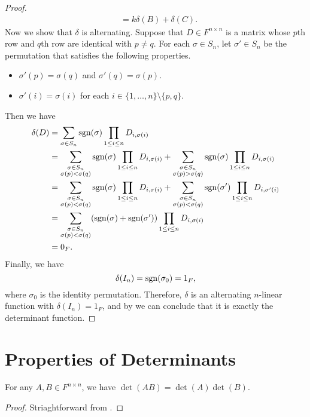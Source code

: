 \begin{proof}
\begin{align*}
    &= k\delta(B) + \delta(C).
  \end{align*}
  Now we show that $\delta$ is alternating.
  Suppose that $D \in F^{n \times n}$ is a matrix whose $p$th row and $q$th row
  are identical with $p \neq q$.
  For each $\sigma \in S_n$, let $\sigma' \in S_n$ be the permutation that
  satisfies the following properties.
  \begin{itemize}
    \item $\sigma'(p) = \sigma(q)$ and $\sigma'(q) = \sigma(p)$.
    \item $\sigma'(i) = \sigma(i)$ for each
    $i \in \{1, \dots, n\} \setminus \{p, q\}$.
  \end{itemize}
  Then we have
  \begin{align*}
    \delta(D)
    &= \sum_{\sigma \in S_n} \operatorname{sgn}(\sigma)
    \prod_{1 \leq i \leq n} D_{i,\sigma(i)} \\
    &= \sum_{\substack{\sigma \in S_n \\ \sigma(p) < \sigma(q)}} \operatorname{sgn}(\sigma)
    \prod_{1 \leq i \leq n} D_{i,\sigma(i)}
    + \sum_{\substack{\sigma \in S_n \\ \sigma(p) > \sigma(q)}} \operatorname{sgn}(\sigma)
    \prod_{1 \leq i \leq n} D_{i,\sigma(i)} \\
    &= \sum_{\substack{\sigma \in S_n \\ \sigma(p) < \sigma(q)}} \operatorname{sgn}(\sigma)
    \prod_{1 \leq i \leq n} D_{i,\sigma(i)}
    + \sum_{\substack{\sigma \in S_n \\ \sigma(p) < \sigma(q)}} \operatorname{sgn}(\sigma')
    \prod_{1 \leq i \leq n} D_{i,\sigma'(i)} \\
    &= \sum_{\substack{\sigma \in S_n \\ \sigma(p) < \sigma(q)}}
    (\operatorname{sgn}(\sigma) + \operatorname{sgn}(\sigma')) \prod_{1 \leq i \leq n} D_{i,\sigma(i)} \\
    &= 0_F.
  \end{align*}
  Finally, we have
  \begin{equation*}
    \delta(I_n) = \operatorname{sgn}(\sigma_0) = 1_F,
  \end{equation*}
  where $\sigma_0$ is the identity permutation.
  Therefore, $\delta$ is an alternating $n$-linear function with
  $\delta(I_n) = 1_F$, and by  we can conclude
  that it is exactly the determinant function.
\end{proof}

\section{Properties of Determinants}
\begin{theorem}
  For any $A, B \in F^{n \times n}$, we have $\det(AB) = \det(A)\det(B)$.
\end{theorem}
\begin{proof}
  Striaghtforward from .
\end{proof}

